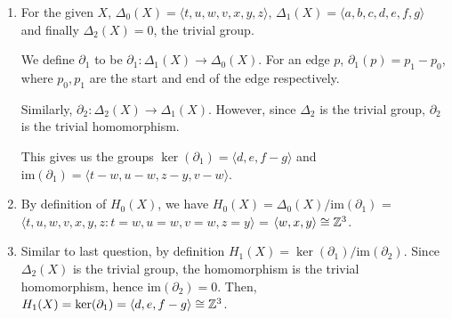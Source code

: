 \documentclass{article}
\begin{document}
\begin{flushleft}
	\begin{enumerate}[label=\alph*)]
		\item For the given $X$, $\Delta_0(X) = \langle t, u, w, v, x, y, z\rangle$, $\Delta_1(X) = \langle a, b, c, d, e, f ,g\rangle$ and finally $\Delta_2(X) = 0$, the trivial group. \newline 
		
		We define $\partial_1$ to be $\partial_1: \Delta_1(X) \rightarrow \Delta_0(X)$. For an edge $p$, $\partial_1(p) = p_1 - p_0$, where $p_0, p_1$ are the start and end of the edge respectively. \newline 
		
		Similarly, $\partial_2: \Delta_2(X) \rightarrow \Delta_1(X)$. However, since $\Delta_2$ is the trivial group, $\partial_2$ is the trivial homomorphism.
		
		This gives us the groups $\ker(\partial_1) = \langle d, e, f - g\rangle$ and $\text{im}(\partial_1) = \langle t-w, u-w, z-y, v-w\rangle$. 
		\item By definition of $H_0(X)$, we have $H_0(X) = \Delta_0(X) / \text{im}(\partial_1)$ = $\langle t, u, w, v, x, y, z : t=w, u=w, v=w, z=y\rangle$ = $\langle w, x, y \rangle \cong \mathbb{Z}^3$.
		\item Similar to last question, by definition $H_1(X) = \ker(\partial_1) / \text{im}(\partial_2)$. Since $\Delta_2(X)$ is the trivial group, the homomorphism is the trivial homomorphism, hence $\text{im}(\partial_2) = 0$. Then, $H_1(X) = \ker(\partial_1) = \langle d, e, f - g\rangle \cong \mathbb{Z}^3$.
	\end{enumerate}
\end{flushleft}
\end{document}
